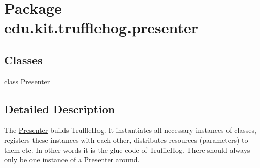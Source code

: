 \hypertarget{namespaceedu_1_1kit_1_1trufflehog_1_1presenter}{}\section{Package edu.\+kit.\+trufflehog.\+presenter}
\label{namespaceedu_1_1kit_1_1trufflehog_1_1presenter}
\subsection*{Classes}
\begin{DoxyCompactItemize}
\item 
class \hyperlink{classedu_1_1kit_1_1trufflehog_1_1presenter_1_1_presenter}{Presenter}
\end{DoxyCompactItemize}


\subsection{Detailed Description}
The \hyperlink{classedu_1_1kit_1_1trufflehog_1_1presenter_1_1_presenter}{Presenter} builds Truffle\+Hog. It instantiates all necessary instances of classes, registers these instances with each other, distributes resources (parameters) to them etc. In other words it is the glue code of Truffle\+Hog. There should always only be one instance of a \hyperlink{classedu_1_1kit_1_1trufflehog_1_1presenter_1_1_presenter}{Presenter} around. 